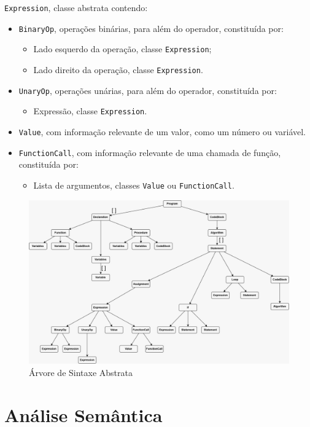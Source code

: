 \documentclass[12pt,a4paper]{report}
\begin{document}
\texttt{Expression}, classe abstrata contendo:
\begin{itemize}
    \item \texttt{BinaryOp}, operações binárias, para além do operador, constituída por:
    \begin{itemize}
        \item Lado esquerdo da operação, classe \texttt{Expression};
        \item Lado direito da operação, classe \texttt{Expression}.
    \end{itemize}
    \item \texttt{UnaryOp}, operações unárias, para além do operador, constituída por:
    \begin{itemize}
        \item Expressão, classe \texttt{Expression}.
    \end{itemize}
    \item \texttt{Value}, com informação relevante de um valor, como um número ou variável.
    \item \texttt{FunctionCall}, com informação relevante de uma chamada de função, constituída por:
    \begin{itemize}
        \item Lista de argumentos, classes \texttt{Value} ou \texttt{FunctionCall}.
    \end{itemize}
\end{itemize}

\begin{figure}[H]
    \centering
    \includegraphics[width=14cm]{images/diagrama.jpeg}
    \caption{Árvore de Sintaxe Abstrata}    
\end{figure}

\chapter{Análise Semântica}
\end{document}
